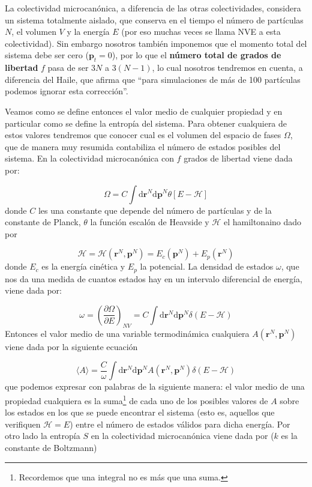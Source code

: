 \documentclass[11pt]{article} %
\newcommand{\parentesis}[1]{\left( #1  \right)}
\newcommand{\parciales}[2]{\frac{\partial #1}{\partial #2}}
\newcommand{\D}{\mathrm{d}}
\newcommand{\Hcal}{\mathcal{H}}
\newcommand{\pn}{\mathbf{p}}
\newcommand{\rn}{\mathbf{r}}
\begin{document}
La colectividad microcanónica, a diferencia de las otras colectividades, considera un sistema totalmente aislado, que conserva en el tiempo el número de partículas $N$, el volumen $V$ y la energía $E$ (por eso muchas veces se llama NVE a esta colectividad). Sin embargo nosotros también imponemos que el momento total del sistema debe ser cero ($\pn_t=0$), por lo que el \textbf{número total de grados de libertad} $f$ pasa de ser $3N$ a $3(N-1)$, lo cual nosotros tendremos en cuenta, a diferencia del Haile, que afirma que ``para simulaciones de más de 100 partículas podemos ignorar esta corrección''. 


Veamos como se define entonces el valor medio de cualquier propiedad y en particular como se define la entropía del sistema. Para obtener cualquiera de estos valores tendremos que conocer cual es el volumen del espacio de fases $\Omega$, que de manera muy resumida contabiliza el número de estados posibles del sistema. En la colectividad microcanónica con $f$ grados de libertad viene dada por:

\begin{equation}
	\Omega =  C \int \D \rn^N \D \pn^N \theta [E-\Hcal]
\end{equation}
donde  $C$ les una constante que depende del número de partículas y de la constante de Planck, $\theta$ la función escalón de Heavside y $\Hcal$ el hamiltonaino dado por 

\begin{equation}
	\Hcal = \Hcal (\rn^N, \pn^N) = E_c (\pn^N) + E_p(\rn^N) \label{Ec:02-01-02}
\end{equation}
donde $E_c$ es la energía cinética y $E_p$ la potencial. La densidad de estados $\omega$, que nos da una medida de cuantos estados hay en un intervalo diferencial de energía, viene dada por:

\begin{equation}
	\omega = \parentesis{\parciales{\Omega}{E}}_{NV} = C \int \D \rn^N \D \pn^N \delta (E-\Hcal)
\end{equation}
Entonces el valor medio de una variable termodinámica cualquiera $A(\rn^N,\pn^N)$ viene dada por la siguiente ecuación

\begin{equation}
	\langle A \rangle = \frac{C}{\omega}  \int \D \rn^N \D \pn^N  A(\rn^N,\pn^N) \delta (E-\Hcal)
\end{equation}
que podemos expresar con palabras de la siguiente manera: el valor medio de una propiedad cualquiera es la suma\footnote{Recordemos que una integral no es más que una suma.} de cada uno de los posibles valores de $A$ sobre los estados en los que se puede encontrar el sistema (esto es, aquellos que verifiquen $\Hcal = E$) entre el número de estados válidos para dicha energía. Por otro lado la entropía $S$ en la colectividad microcanónica viene dada por  ($k$ es la constante de Boltzmann)
\end{document}
